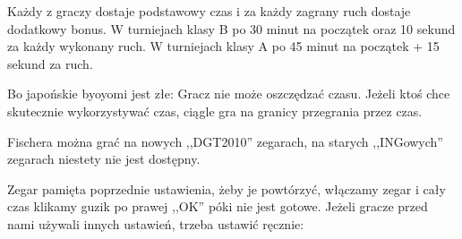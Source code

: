 




Każdy z graczy dostaje podstawowy czas i za każdy zagrany ruch dostaje dodatkowy bonus. W turniejach klasy B po 30 minut na początek oraz 10 sekund za każdy wykonany ruch. W turniejach klasy A po 45 minut na początek + 15 sekund za ruch.

\vskip 30pt
\subtitle{Dlaczego?}

Bo japońskie byoyomi jest złe: Gracz nie może oszczędzać czasu. Jeżeli ktoś chce skutecznie wykorzystywać czas, ciągle gra na granicy przegrania przez czas.

\vskip 30pt
\subtitle{Jak?}

Fischera można grać na nowych ,,DGT2010'' zegarach, na starych ,,INGowych'' zegarach niestety nie jest dostępny.

Zegar pamięta poprzednie ustawienia, żeby je powtórzyć, włączamy zegar i cały czas klikamy guzik po prawej ,,OK'' póki nie jest gotowe. Jeżeli gracze przed nami używali innych ustawień, trzeba ustawić ręcznie:



